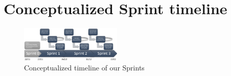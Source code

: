 \section{Conceptualized Sprint timeline}
\label{sec:sprint-timeline}

\begin{figure}[htb]
\centering
    \includegraphics[angle=90, width=0.43\textwidth]{Appendices/graphics/sprinttimeline.png}
    \caption{Conceptualized timeline of our Sprints}
    \label{fig:sprintfig}
\end{figure}
